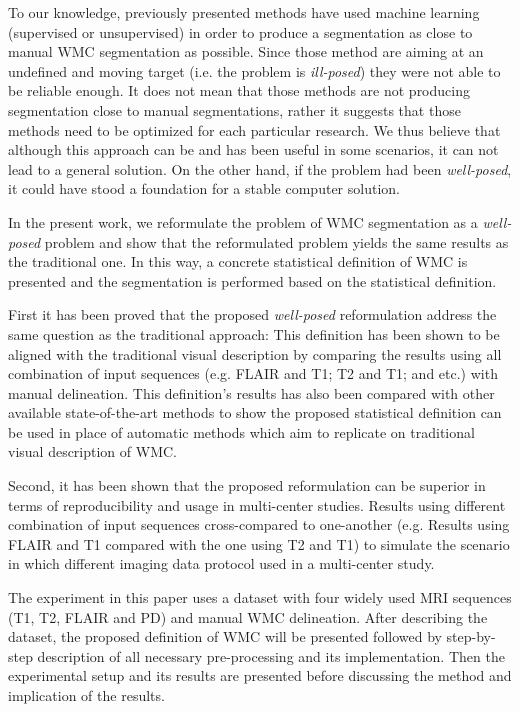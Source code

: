 To our knowledge, previously presented methods have used machine learning (supervised or unsupervised) in order to produce a segmentation as close to manual WMC segmentation as possible. Since those method are aiming at an undefined and moving target (i.e. the problem is \textit{ill-posed}) they were not able to be reliable enough. It does not mean that those methods are not producing segmentation close to manual segmentations, rather it suggests that those methods need to be optimized for each particular research. We thus believe that although this approach can be and has been useful in some scenarios, it can not lead to a general solution. On the other hand, if the problem had been \textit{well-posed}, it could have stood a foundation for a stable computer solution.

In the present work, we reformulate the problem of WMC segmentation as a \textit{well-posed} problem and show that the reformulated problem yields the same results as the traditional one. In this way, a concrete statistical definition of WMC is presented and the segmentation is performed based on the statistical definition.

First it has been proved that the proposed \textit{well-posed} reformulation address the same question as the traditional approach: This definition has been shown to be aligned with the traditional visual description by comparing the results using all combination of input sequences (e.g. FLAIR and T1; T2 and T1; and etc.) with manual delineation. This definition's results has also been compared with other available state-of-the-art methods to show the proposed statistical definition can be used in place of automatic methods which aim to replicate on traditional visual description of WMC.

Second, it has been shown that the proposed reformulation can be superior in terms of reproducibility and usage in multi-center studies. Results using different combination of input sequences cross-compared to one-another (e.g. Results using FLAIR and T1 compared with the one using T2 and T1) to simulate the scenario in which different imaging data protocol used in a multi-center study.

The experiment in this paper uses a dataset with four widely used MRI sequences (T1, T2, FLAIR and PD) and manual WMC delineation. After describing the dataset, the proposed definition of WMC will be presented followed by step-by-step description of all necessary pre-processing and its implementation. Then the experimental setup and its results are presented before discussing the method and implication of the results.

